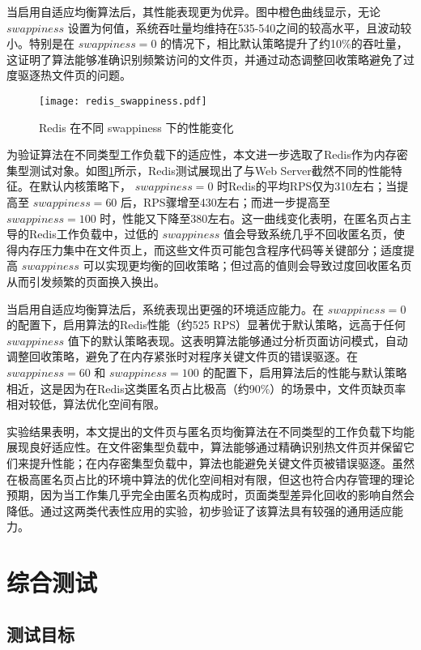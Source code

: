 当启用自适应均衡算法后，其性能表现更为优异。图中橙色曲线显示，无论 \(swappiness\) 设置为何值，系统吞吐量均维持在535-540之间的较高水平，且波动较小。特别是在 \(swappiness =0\) 的情况下，相比默认策略提升了约10\%的吞吐量，这证明了算法能够准确识别频繁访问的文件页，并通过动态调整回收策略避免了过度驱逐热文件页的问题。

\begin{figure}[htbp]
    \centering
    \texttt{[image: redis\_swappiness.pdf]}
    \caption{Redis 在不同  swappiness  下的性能变化}
    \label{fig:redis_swappiness}
\end{figure}

为验证算法在不同类型工作负载下的适应性，本文进一步选取了Redis作为内存密集型测试对象。如图\ref{fig:redis_swappiness}所示，Redis测试展现出了与Web Server截然不同的性能特征。在默认内核策略下， \(swappiness =0\) 时Redis的平均RPS仅为310左右；当提高至 \(swappiness =60\) 后，RPS骤增至430左右；而进一步提高至 \(swappiness =100\) 时，性能又下降至380左右。这一曲线变化表明，在匿名页占主导的Redis工作负载中，过低的 \(swappiness\) 值会导致系统几乎不回收匿名页，使得内存压力集中在文件页上，而这些文件页可能包含程序代码等关键部分；适度提高 \(swappiness\) 可以实现更均衡的回收策略；但过高的值则会导致过度回收匿名页从而引发频繁的页面换入换出。

当启用自适应均衡算法后，系统表现出更强的环境适应能力。在 \(swappiness =0\) 的配置下，启用算法的Redis性能（约525 RPS）显著优于默认策略，远高于任何 \(swappiness\) 值下的默认策略表现。这表明算法能够通过分析页面访问模式，自动调整回收策略，避免了在内存紧张时对程序关键文件页的错误驱逐。在 \(swappiness =60\) 和 \(swappiness =100\) 的配置下，启用算法后的性能与默认策略相近，这是因为在Redis这类匿名页占比极高（约90\%）的场景中，文件页缺页率相对较低，算法优化空间有限。

实验结果表明，本文提出的文件页与匿名页均衡算法在不同类型的工作负载下均能展现良好适应性。在文件密集型负载中，算法能够通过精确识别热文件页并保留它们来提升性能；在内存密集型负载中，算法也能避免关键文件页被错误驱逐。虽然在极高匿名页占比的环境中算法的优化空间相对有限，但这也符合内存管理的理论预期，因为当工作集几乎完全由匿名页构成时，页面类型差异化回收的影响自然会降低。通过这两类代表性应用的实验，初步验证了该算法具有较强的通用适应能力。

\section{综合测试}

\subsection{测试目标}

